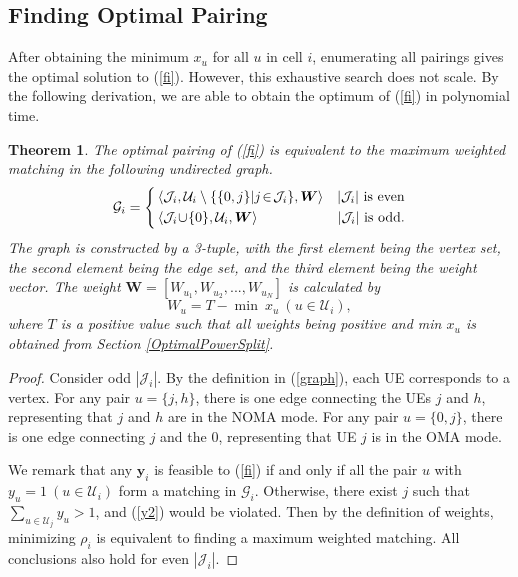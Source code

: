 \documentclass[10pt,journal,final,finalsubmission,twocolumn]{IEEEtran}
\newtheorem{theorem}{Theorem}
\begin{document}
 
\subsection{Finding Optimal Pairing}

After obtaining the minimum $x_u$ for all $u$ in cell $i$, enumerating all pairings gives the optimal solution to (\ref{fi}). However, this exhaustive search does not scale. By the following derivation, we are able to obtain the optimum of (\ref{fi}) in polynomial time.

\begin{theorem}
The optimal pairing of (\ref{fi}) is equivalent to the maximum weighted matching in the following undirected graph.
\begin{equation}\label{graph}
\mathcal{G}_i=\left\{
\begin{aligned}
&\left \langle\mathcal{J}_i, \mathcal{U}_i \setminus \{\{0,j\}|j\!\in\!\mathcal{J}_i \}, \boldsymbol{W}\right \rangle&|\mathcal{J}_i|{\rm\ is\ even}\\
&\left \langle\mathcal{J}_i\!\cup\!\{0 \}, \mathcal{U}_i, \boldsymbol{W}\right \rangle&|\mathcal{J}_i|{\rm\ is\ odd}.\end{aligned}
\right.
\end{equation}
The graph is constructed by a 3-tuple, with the first element being the vertex set, the second element being the edge set, and the third element being the weight vector. The weight $\boldsymbol{W} = [W_{u_1},W_{u_2},...,W_{u_N}]$ is calculated by 
\begin{equation}
W_u = T - {\min\ x_u}\ (u\in \mathcal{U}_i),
\end{equation}
where $T$ is a positive value such that all weights being positive and min $ x_u$ is obtained from Section \ref{OptimalPowerSplit}.
\end{theorem}
\begin{proof}
Consider odd $|\mathcal{J}_i|$. By the definition in (\ref{graph}), each UE corresponds to a vertex. For any pair $u = \{j,h\}$, there is one edge connecting the UEs $j$ and $h$, representing that $j$ and $h$ are in the NOMA mode. For any pair $u = \{0,j\}$, there is one edge connecting $j$ and the $0$, representing that UE $j$ is in the OMA mode. 

We remark that any $\boldsymbol{y}_i$ is feasible to (\ref{fi}) if and only if all the pair $u$ with $y_u=1\ (u\in \mathcal{U}_i)$ form a matching in $\mathcal{G}_i$. Otherwise, there exist $j$ such that $\sum_{u\in \mathcal{U}_j}y_u>1$, and (\ref{y2}) would be violated. Then by the definition of weights, minimizing $\rho_i$ is equivalent to finding a maximum weighted matching. All conclusions also hold for even $|\mathcal{J}_i|$.
\end{proof}
\end{document}
